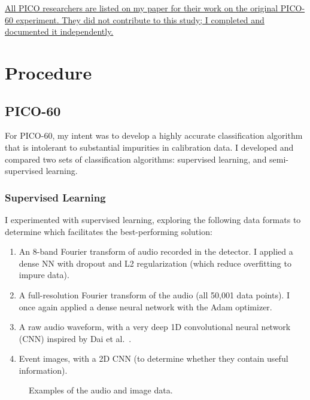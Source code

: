 \documentclass[12pt]{article}
\begin{document}
\ul{All PICO researchers are listed on my paper for their work on the original PICO-60 experiment. They did not contribute to this study; I completed and documented it independently.}

\section{Procedure}

\subsection{PICO-60}

For PICO-60, my intent was to develop a highly accurate classification algorithm that is intolerant to substantial impurities in calibration data. I developed and compared two sets of classification algorithms: supervised learning, and semi-supervised learning.

\subsubsection{Supervised Learning}

I experimented with supervised learning, exploring the following data formats to determine which facilitates the best-performing solution:

\begin{enumerate}
    \item An 8-band Fourier transform of audio recorded in the detector. I applied a dense NN with dropout \cite{dropout} and L2 regularization (which reduce overfitting to impure data).
    \item A full-resolution Fourier transform of the audio (all 50,001 data points). I once again applied a dense neural network with the Adam \cite{adam} optimizer.
    \item A raw audio waveform, with a very deep 1D convolutional neural network (CNN) inspired by Dai et al.\ \cite{verydeepconvnets}.
    \item Event images, with a 2D CNN (to determine whether they contain useful information).
\end{enumerate}

\begin{figure}[ht]
    \centering
    \qquad
    \caption{Examples of the audio and image data.}
\end{figure}
\end{document}
